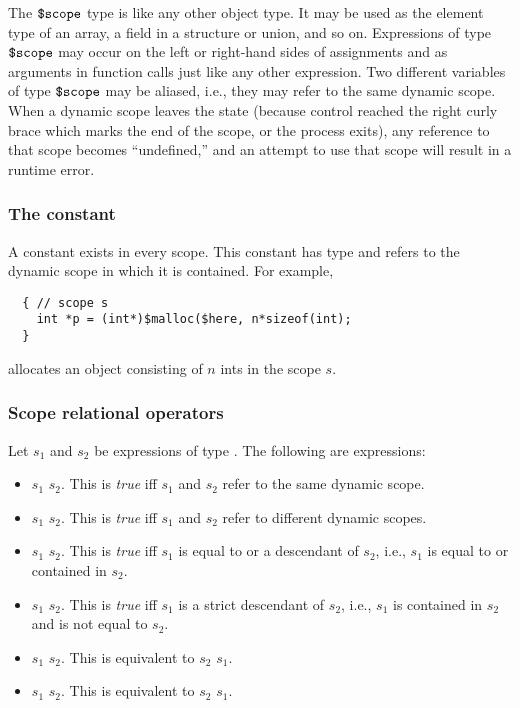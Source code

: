 The $\mbox{\texttt{\${}scope}}$ type is like any other object type.  It may be used as
the element type of an array, a field in a structure or union, and so
on.  Expressions of type $\mbox{\texttt{\${}scope}}$ may occur on the left or right-hand
sides of assignments and as arguments in function calls just like any
other expression.  Two different variables of type $\mbox{\texttt{\${}scope}}$ may be
aliased, i.e., they may refer to the same dynamic scope.  When a
dynamic scope leaves the state (because control reached the right
curly brace which marks the end of the scope, or the process exits),
any reference to that scope becomes ``undefined,'' and an attempt to
use that scope will result in a runtime error.

\subsubsection{The constant \chere}

A constant \chere{} exists in every scope.  This constant has
type \cscope{} and refers to the dynamic scope in which it is
contained.  For example,
\begin{verbatim}
  { // scope s
    int *p = (int*)$malloc($here, n*sizeof(int);
  }
\end{verbatim}
allocates an object consisting of $n$ ints in the scope $s$.

\subsubsection{Scope relational operators}

Let $s_1$ and $s_2$ be expressions of type \cscope.  The following
are expressions:
\begin{itemize}
\item $s_1$ \ct{==} $s_2$.  This is \emph{true} iff $s_1$ and $s_2$
  refer to the same dynamic scope.
\item  $s_1$ \ct{!=} $s_2$.  This is \emph{true} iff $s_1$ and $s_2$
  refer to different dynamic scopes.
\item  $s_1$ \ct{<=} $s_2$.  This is \emph{true} iff $s_1$ is equal to
  or a descendant of $s_2$, i.e., $s_1$ is equal to or contained in $s_2$.
\item  $s_1$ \ct{<} $s_2$.  This is \emph{true} iff $s_1$ is a strict 
  descendant of $s_2$, i.e., $s_1$ is contained in $s_2$ and is not
  equal to $s_2$.
\item $s_1$ \ct{>} $s_2$.  This is equivalent to $s_2$ \ct{<} $s_1$.
\item  $s_1$ \ct{>=} $s_2$.  This is equivalent to $s_2$ \ct{<=} $s_1$.
\end{itemize}


